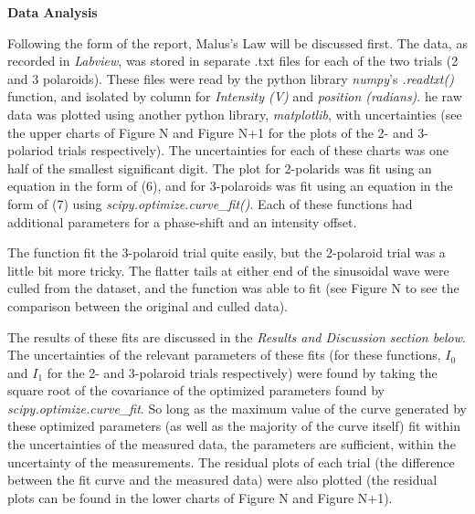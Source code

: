 \documentclass[11pt]{article}
\begin{document}
\begin{multicols}{2}
    \vspace{10pt}

     \selectfont \textbf{Data Analysis}
    
     \selectfont 
    
    Following the form of the report, Malus's Law will be discussed first. The data, as recorded in \textit{Labview}, was stored in separate .txt files for each of the two trials (2 and 3 polaroids). 
    These files were read by the python library \textit{numpy}'s \textit{.readtxt()} function, and isolated by column for \textit{Intensity (V)} and \textit{position (radians)}.
    he raw data was plotted using another python library, \textit{matplotlib}, with uncertainties (see the upper charts of Figure N and Figure N+1 for the plots of the 2- and 3-polariod trials respectively).
    The uncertainties for each of these charts was one half of the smallest significant digit.
    The plot for 2-polarids was fit using an equation in the form of (6), and for 3-polaroids was fit using an equation in the form of (7) using \textit{scipy.optimize.curve\_fit()}. 
    Each of these functions had additional parameters for a phase-shift and an intensity offset.  

    The function fit the 3-polaroid trial quite easily, but the 2-polaroid trial was a little bit more tricky. The flatter tails at either end of the sinusoidal wave were culled from the dataset, and the function was able to fit (see Figure N to see the comparison between the original and culled data). 

    The results of these fits are discussed in the \textit{Results and Discussion section below}. The uncertainties of the relevant parameters of these fits (for these functions, $I_0$ and $I_1$ for the 2- and 3-polaroid trials respectively) were found by taking the square root of the covariance of the optimized parameters found by \textit{scipy.optimize.curve\_fit}. So long as the maximum value of the curve generated by these optimized parameters (as well as the majority of the curve itself) fit within the uncertainties of the measured data, the parameters are sufficient, within the uncertainty of the measurements. The residual plots of each trial (the difference between the fit curve and the measured data) were also plotted (the residual plots can be found in the lower charts of Figure N and Figure N+1).
    

\end{multicols}
\end{document}
